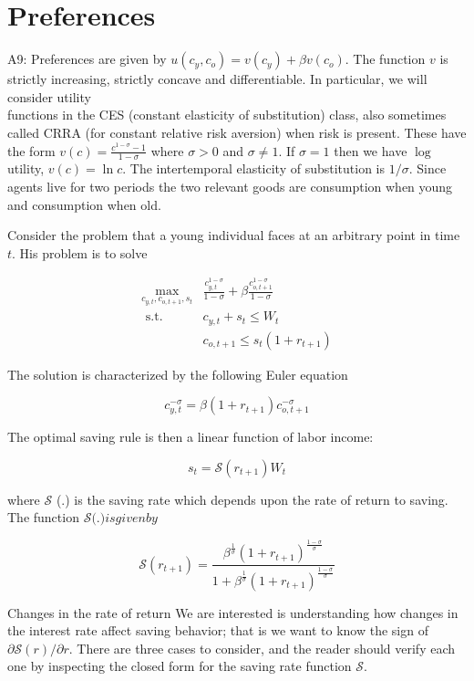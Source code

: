 \documentclass[10pt]{article}
\begin{document}
\section*{Preferences}
A9: Preferences are given by $u\left(c_{y}, c_{o}\right)=v\left(c_{y}\right)+\beta v\left(c_{o}\right)$. The function $v$ is strictly increasing, strictly concave and differentiable. In particular, we will consider utility\\
functions in the CES (constant elasticity of substitution) class, also sometimes called CRRA (for constant relative risk aversion) when risk is present. These have the form $v(c)=\frac{c^{1-\sigma}-1}{1-\sigma}$ where $\sigma>0$ and $\sigma \neq 1$. If $\sigma=1$ then we have $\log$ utility, $v(c)=\ln c$. The intertemporal elasticity of substitution is $1 / \sigma$. Since agents live for two periods the two relevant goods are consumption when young and consumption when old.

Consider the problem that a young individual faces at an arbitrary point in time $t$. His problem is to solve

$$
\begin{aligned}
\max _{c_{y, t}, c_{o, t+1}, s_{t}} & \frac{c_{y, t}^{1-\sigma}}{1-\sigma}+\beta \frac{c_{o, t+1}^{1-\sigma}}{1-\sigma} \\
\text { s.t. } & c_{y, t}+s_{t} \leq W_{t} \\
& c_{o, t+1} \leq s_{t}\left(1+r_{t+1}\right)
\end{aligned}
$$

The solution is characterized by the following Euler equation

$$
c_{y, t}^{-\sigma}=\beta\left(1+r_{t+1}\right) c_{o, t+1}^{-\sigma}
$$

The optimal saving rule is then a linear function of labor income:

$$
s_{t}=\mathcal{S}\left(r_{t+1}\right) W_{t}
$$

where $\mathcal{S}$ (.) is the saving rate which depends upon the rate of return to saving. The function $\mathcal{S}($.$) is given by$


\begin{equation*}
\mathcal{S}\left(r_{t+1}\right)=\frac{\beta^{\frac{1}{\sigma}}\left(1+r_{t+1}\right)^{\frac{1-\sigma}{\sigma}}}{1+\beta^{\frac{1}{\sigma}}\left(1+r_{t+1}\right)^{\frac{1-\sigma}{\sigma}}} \tag{3.1}
\end{equation*}


Changes in the rate of return We are interested is understanding how changes in the interest rate affect saving behavior; that is we want to know the sign of $\partial \mathcal{S}(r) / \partial r$. There are three cases to consider, and the reader should verify each one by inspecting the closed form for the saving rate function $\mathcal{S}$.
\end{document}
